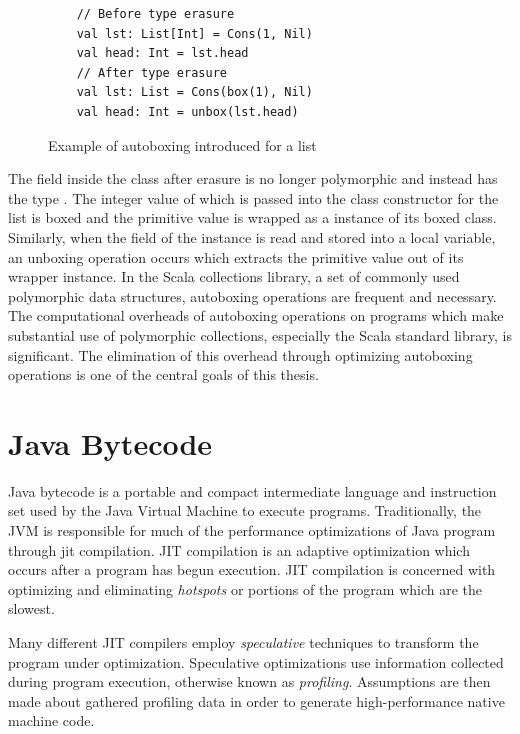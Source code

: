 \begin{figure}[!htb]
	\begin{verbatim}
	// Before type erasure 	
	val lst: List[Int] = Cons(1, Nil)
	val head: Int = lst.head
	// After type erasure
	val lst: List = Cons(box(1), Nil)
	val head: Int = unbox(lst.head) 
	\end{verbatim}
	\caption{Example of autoboxing introduced for a list}
	\label{example:autoboxing}
\end{figure}

The  field inside the  class after erasure is no longer polymorphic and instead has the type . 
The integer value of  which is passed into the class constructor for the list is boxed and the primitive value is wrapped as a instance of its boxed class.
Similarly, when the  field of the instance is read and stored into a local variable, an unboxing operation occurs which extracts the primitive value out of its wrapper instance.
In the Scala collections library, a set of commonly used polymorphic data structures, autoboxing operations are frequent and necessary.
The computational overheads of autoboxing operations on programs which make substantial use of polymorphic collections, especially the Scala standard library, is significant\cite{scala:collections-optimization}.
The elimination of this overhead through optimizing autoboxing operations is one of the central goals of this thesis.

\section{Java Bytecode}

Java bytecode is a portable and compact intermediate language and instruction set used by the Java Virtual Machine to execute programs.
Traditionally, the JVM is responsible for much of the performance optimizations of Java program\cite{java:hotspot} through \acrfull{jit} compilation.
JIT compilation is an adaptive optimization which occurs after a program has begun execution.
JIT compilation is concerned with optimizing and eliminating \textit{hotspots} or portions of the program which are the slowest.


Many different JIT compilers\cite{java:sablevm}\cite{java:jikesrvm} employ \textit{speculative} techniques to transform the program under optimization.
Speculative optimizations use information collected during program execution, otherwise known as \textit{profiling}. 
Assumptions are then made about gathered profiling data in order to generate high-performance native machine code.


